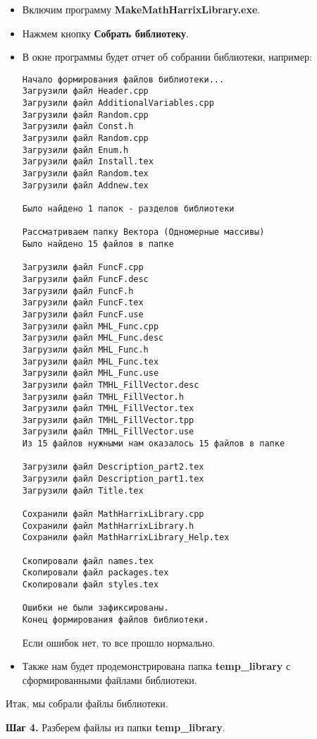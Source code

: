\documentclass[a4paper,12pt]{article}
\begin{document}
\begin{itemize}
\item Включим программу \textbf{MakeMathHarrixLibrary.exe}.
\item Нажмем кнопку \textbf{Собрать библиотеку}.
\item В окне программы будет отчет об собрании библиотеки, например:
\begin{lstlisting}[label=examplereport, caption=Пример отчета о сборке библиотеки]
Начало формирования файлов библиотеки...
Загрузили файл Header.cpp
Загрузили файл AdditionalVariables.cpp
Загрузили файл Random.cpp
Загрузили файл Const.h
Загрузили файл Random.cpp
Загрузили файл Enum.h
Загрузили файл Install.tex
Загрузили файл Random.tex
Загрузили файл Addnew.tex

Было найдено 1 папок - разделов библиотеки

Рассматриваем папку Вектора (Одномерные массивы)
Было найдено 15 файлов в папке

Загрузили файл FuncF.cpp
Загрузили файл FuncF.desc
Загрузили файл FuncF.h
Загрузили файл FuncF.tex
Загрузили файл FuncF.use
Загрузили файл MHL_Func.cpp
Загрузили файл MHL_Func.desc
Загрузили файл MHL_Func.h
Загрузили файл MHL_Func.tex
Загрузили файл MHL_Func.use
Загрузили файл TMHL_FillVector.desc
Загрузили файл TMHL_FillVector.h
Загрузили файл TMHL_FillVector.tex
Загрузили файл TMHL_FillVector.tpp
Загрузили файл TMHL_FillVector.use
Из 15 файлов нужными нам оказалось 15 файлов в папке

Загрузили файл Description_part2.tex
Загрузили файл Description_part1.tex
Загрузили файл Title.tex

Сохранили файл MathHarrixLibrary.cpp
Сохранили файл MathHarrixLibrary.h
Сохранили файл MathHarrixLibrary_Help.tex

Скопировали файл names.tex
Скопировали файл packages.tex
Скопировали файл styles.tex

Ошибки не были зафиксированы.
Конец формирования файлов библиотеки.
\end{lstlisting}

Если ошибок нет, то все прошло нормально.
\item Также нам будет продемонстрирована папка \textbf{temp\_library} с сформированными файлами библиотеки.
\end{itemize}

Итак, мы собрали файлы библиотеки.

\textbf{Шаг 4.}\label{step4} Разберем файлы из папки \textbf{temp\_library}.
\end{document}
